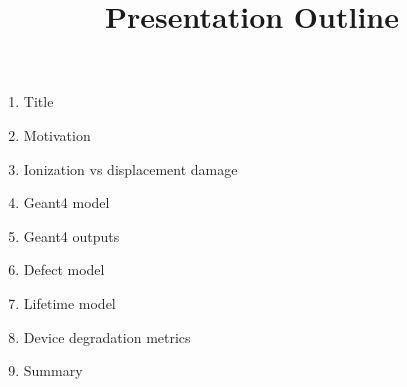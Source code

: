 \documentclass[11pt]{article}
\title{Presentation Outline}
\begin{document}
\maketitle

\begin{enumerate}
    \item Title
    \item Motivation
    \item Ionization vs displacement damage
    \item Geant4 model
    \item Geant4 outputs
    \item Defect model
    \item Lifetime model
    \item Device degradation metrics
    \item Summary
\end{enumerate}
\end{document}
